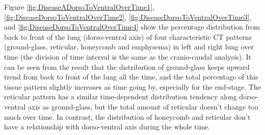Figure \ref{fig:DiseaseADorsoToVentralOverTime1}, \ref{fig:DiseaseDorsoToVentralOverTime2}, \ref{fig:DiseaseDorsoToVentralOverTime3}, and \ref{fig:DiseaseDorsoToVentralOverTime4} show the percentage distribution from back to front of the lung (dorso-ventral axis) of four characteristic CT patterns (ground-glass, reticular, honeycomb and emphysema) in left and right lung over time (the division of time interval is the same as the cranio-caudal analysis). It can be seen from the result that the distribution of ground-glass keeps upward trend from back to front of the lung all the time, and the total percentage of this tissue pattern slightly increases as time going by, especially for the end-stage. The reticular pattern has a similar time-dependent distribution tendency along dorso-ventral axis as ground-glass, but the total amount of reticular doesn't change too much over time. In contrast, the distribution of honeycomb and reticular don't have a relationship with dorso-ventral axis during the whole time.


